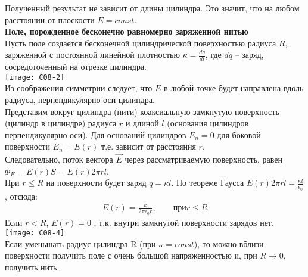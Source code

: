 \documentclass[__main__.tex]{subfiles}
\begin{document}
 Полученный результат не зависит от длины цилиндра. Это значит, что на любом расстоянии от плоскости $E = const$.\\
 \textbf{Поле, порожденное бесконечно равномерно заряженной нитью}\\
 Пусть поле создается бесконечной цилиндрической поверхностью радиуса $R$, заряженной с постоянной линейной плотностью $\kappa = \frac{dq}{dl}$, где $dq$ – заряд, сосредоточенный на отрезке цилиндра.\\
 \texttt{[image: С08-2]}\\
 Из соображения симметрии следует, что $E$ в любой точке будет направлена вдоль радиуса, перпендикулярно оси цилиндра.\\
 Представим вокруг цилиндра (нити) коаксиальную замкнутую поверхность (цилиндр в цилиндре) радиуса $r$ и длиной $l$ (основания цилиндров перпендикулярно оси). Для оснований цилиндров $E_n = 0$  для боковой поверхности $E_n = E(r)$ т.е. зависит от расстояния $r$.\\ 
 Следовательно, поток вектора $\vec{E}$ через рассматриваемую поверхность, равен $\Phi_E = E(r)S = E(r)2\pi rl$.\\
 При $r \leq R$  на поверхности будет заряд $q = \kappa l$. По теореме Гаусса $E(r)2\pi rl = \frac{\kappa l}{\epsilon_0}$, отсюда:\\
 \begin{gather}
 E(r) = \frac{\kappa}{2 \pi \epsilon_0 r}, \qquad \text{при} r\leq R
 \end{gather} 
 Если  $r<R$, $E(r) = 0$ , т.к. внутри замкнутой поверхности зарядов нет.\\
 \texttt{[image: С08-4]}\\
 Если уменьшать радиус цилиндра R (при $\kappa = const$), то можно вблизи поверхности получить поле с очень большой напряженностью и, при $R \to 0$, получить нить. \\
\end{document}
